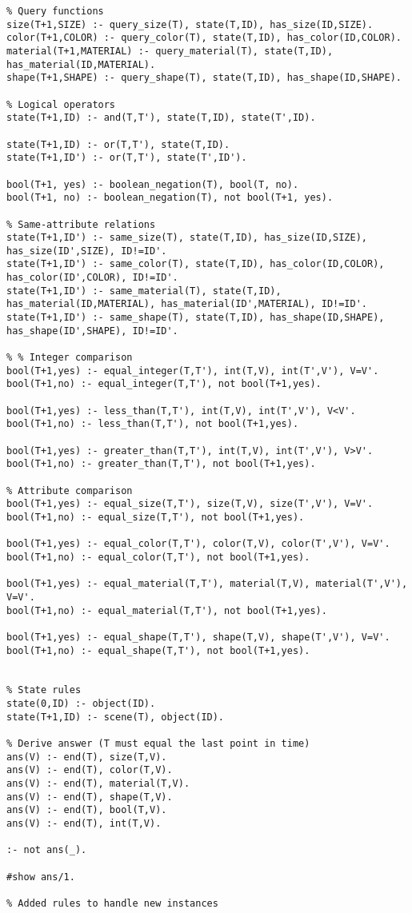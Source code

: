\begin{lstlisting}
% Query functions
size(T+1,SIZE) :- query_size(T), state(T,ID), has_size(ID,SIZE).
color(T+1,COLOR) :- query_color(T), state(T,ID), has_color(ID,COLOR).
material(T+1,MATERIAL) :- query_material(T), state(T,ID), has_material(ID,MATERIAL).
shape(T+1,SHAPE) :- query_shape(T), state(T,ID), has_shape(ID,SHAPE).

% Logical operators
state(T+1,ID) :- and(T,T'), state(T,ID), state(T',ID).

state(T+1,ID) :- or(T,T'), state(T,ID).
state(T+1,ID') :- or(T,T'), state(T',ID').

bool(T+1, yes) :- boolean_negation(T), bool(T, no).
bool(T+1, no) :- boolean_negation(T), not bool(T+1, yes).

% Same-attribute relations
state(T+1,ID') :- same_size(T), state(T,ID), has_size(ID,SIZE), has_size(ID',SIZE), ID!=ID'.
state(T+1,ID') :- same_color(T), state(T,ID), has_color(ID,COLOR), has_color(ID',COLOR), ID!=ID'.
state(T+1,ID') :- same_material(T), state(T,ID), has_material(ID,MATERIAL), has_material(ID',MATERIAL), ID!=ID'.
state(T+1,ID') :- same_shape(T), state(T,ID), has_shape(ID,SHAPE), has_shape(ID',SHAPE), ID!=ID'.

% % Integer comparison
bool(T+1,yes) :- equal_integer(T,T'), int(T,V), int(T',V'), V=V'.
bool(T+1,no) :- equal_integer(T,T'), not bool(T+1,yes).

bool(T+1,yes) :- less_than(T,T'), int(T,V), int(T',V'), V<V'.
bool(T+1,no) :- less_than(T,T'), not bool(T+1,yes).

bool(T+1,yes) :- greater_than(T,T'), int(T,V), int(T',V'), V>V'.
bool(T+1,no) :- greater_than(T,T'), not bool(T+1,yes).

% Attribute comparison
bool(T+1,yes) :- equal_size(T,T'), size(T,V), size(T',V'), V=V'.
bool(T+1,no) :- equal_size(T,T'), not bool(T+1,yes).

bool(T+1,yes) :- equal_color(T,T'), color(T,V), color(T',V'), V=V'.
bool(T+1,no) :- equal_color(T,T'), not bool(T+1,yes).

bool(T+1,yes) :- equal_material(T,T'), material(T,V), material(T',V'), V=V'.
bool(T+1,no) :- equal_material(T,T'), not bool(T+1,yes).

bool(T+1,yes) :- equal_shape(T,T'), shape(T,V), shape(T',V'), V=V'.
bool(T+1,no) :- equal_shape(T,T'), not bool(T+1,yes).


% State rules
state(0,ID) :- object(ID).
state(T+1,ID) :- scene(T), object(ID).

% Derive answer (T must equal the last point in time)
ans(V) :- end(T), size(T,V).
ans(V) :- end(T), color(T,V).
ans(V) :- end(T), material(T,V).
ans(V) :- end(T), shape(T,V).
ans(V) :- end(T), bool(T,V).
ans(V) :- end(T), int(T,V).

:- not ans(_).

#show ans/1.

% Added rules to handle new instances
\end{lstlisting}
